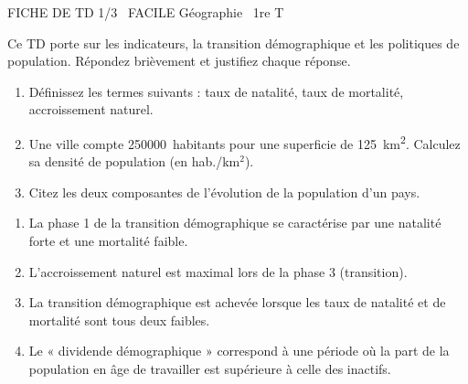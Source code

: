 \documentclass[11pt]{article}
\begin{document}
\begin{tcolorbox}[enhanced,colback=popink,colframe=popink,arc=10pt,boxrule=0pt,left=12pt,right=12pt,top=9pt,bottom=9pt]
{\color{white}\popxbold\small FICHE DE TD 1/3 \textbullet\ FACILE \hfill Géographie \textbullet\ 1re T\par}
\end{tcolorbox}
\vspace{4pt}
Ce TD porte sur les indicateurs, la transition démographique et les politiques de population. Répondez brièvement et justifiez chaque réponse.

\begin{exercice}
\begin{enumerate}
    \item Définissez les termes suivants : taux de natalité, taux de mortalité, accroissement naturel.
    \item Une ville compte \SI{250000}{habitants} pour une superficie de \SI{125}{km^2}. Calculez sa densité de population (en hab./km$^2$).
    \item Citez les deux composantes de l'évolution de la population d'un pays.
\end{enumerate}
\end{exercice}

\begin{exercice}
\begin{enumerate}
    \item La phase 1 de la transition démographique se caractérise par une natalité forte et une mortalité faible.
    \item L'accroissement naturel est maximal lors de la phase 3 (transition).
    \item La transition démographique est achevée lorsque les taux de natalité et de mortalité sont tous deux faibles.
    \item Le « dividende démographique » correspond à une période où la part de la population en âge de travailler est supérieure à celle des inactifs.
\end{enumerate}
\end{exercice}
\end{document}
